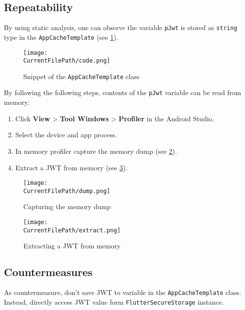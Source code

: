 \subsection*{Repeatability}

By using static analysis, one can observe the variable \texttt{pJwt} is stored as \texttt{string} type in the \texttt{AppCacheTemplate} (see \cref{figure:code}).

\begin{figure}[H]
\centering
\texttt{[image: \\CurrentFilePath/code.png]}
\caption{Snippet of the \texttt{AppCacheTemplate} class}
\label{figure:code}
\end{figure}

By following the following steps, contents of the \texttt{pJwt} variable can be read from memory:

\begin{enumerate}
    \item Click \textbf{View} > \textbf{Tool Windows} > \textbf{Profiler} in the Android Studio.
    \item Select the device and app process.
    \item In memory profiler capture the memory dump (see \cref{figure:dump}).
    \item Extract a JWT from memory (see \cref{figure:extract}).
\end{enumerate}

 \begin{figure}[H]
 \centering
 \texttt{[image: \\CurrentFilePath/dump.png]}
 \caption{Capturing the memory dump}
 \label{figure:dump}
 \end{figure}

 \begin{figure}[H]
 \centering
 \texttt{[image: \\CurrentFilePath/extract.png]}
 \caption{Extracting a JWT from memory}
 \label{figure:extract}
 \end{figure}


\subsection*{Countermeasures}

As countermeasure, don't save JWT to variable in the \texttt{AppCacheTemplate} class.
Instead, directly access JWT value form \texttt{FlutterSecureStorage} instance.

